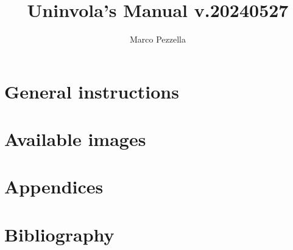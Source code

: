 \documentclass{article}
\title{Uninvola's Manual v.20240527}
\author{Marco Pezzella}
\begin{document}
\maketitle
\part{General instructions}

\newpage

\part{Available images }\label{images}



\newpage

\part{Appendices}



\part{Bibliography}


 
\end{document}
